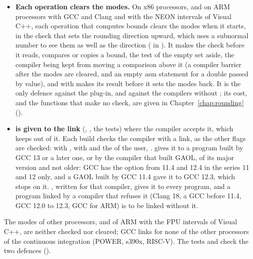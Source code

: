 \documentclass[12pt,a4paper,twoside,openright]{book}
\begin{document}
\begin{itemize}
\item[$\bullet$] \textbf{Each operation clears the modes.} On x86 processors,
  and on ARM processors with GCC and Clang and with the NEON intervals of
  Visual C++, each operation that computes bounds clears the modes when it
  starts, in the check that sets the rounding direction upward, which uses a
  subnormal number to see them as well as the direction
  ( in ). It makes
  the check before it reads, compares or copies a bound, the test of the
  empty set aside, the compiler being kept from moving a comparison above it
  (a compiler barrier after the modes are cleared, and an empty asm statement
  for a double passed by value), and with 
  makes its result before it sets the modes back. It is the only defence
  against the plug-in, and against the compilers without
  ; its cost, and the functions that make no check, are
  given in Chapter~\ref{chap:rounding} ().
\item[$\bullet$] \textbf{ is given to the link}
  (, , the tests) where the compiler accepts
  it, which keeps  out of it. Each build checks the
  compiler with a link, as the other flags are checked:
   with
  ,  with
   and the  of the user,
  .  gives it to a program built
  by GCC 13 or a later one, or by the compiler that built GAOL, of its major
  version and not older: GCC has the option from 11.4 and 12.4 in the series
  11 and 12 only, and a GAOL built by GCC 11.4 gave it to GCC 12.3, which
  stops on it. , written for that compiler, gives it to every
  program, and a program linked by a compiler that refuses it (Clang 18, a GCC
  before 11.4, GCC 12.0 to 12.3, GCC for ARM) is to be linked without it.
\end{itemize}

\noindent
The modes of other processors, and of ARM with the FPU intervals of Visual
C++, are neither checked nor cleared; GCC links  for none
of the other processors of the continuous integration (POWER, s390x, RISC-V).
The tests  and
 check the two defences
().
\end{document}
